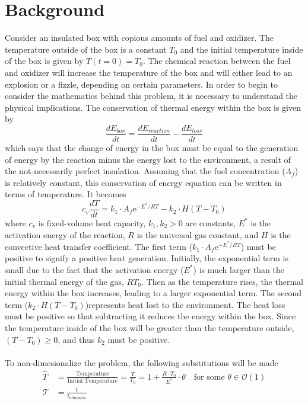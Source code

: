 \documentclass{article}
\begin{document}
\section*{Background}
Consider an insulated box with copious amounts of fuel and oxidizer.  The temperature outside of the box is a constant $T_0$ and the initial temperature inside of the box is given by $T(t=0)=T_0$.  The chemical reaction between the fuel and oxidizer will increase the temperature of the box and will either lead to an explosion or a fizzle, depending on certain parameters.  In order to begin to consider the mathematics behind this problem, it is necessary to understand the physical implications.  The conservation of thermal energy within the box is given by $$\frac{dE_{box}}{dt} = \frac{dE_{reaction}}{dt} - \frac{dE_{loss}}{dt}$$ 
which says that the change of energy in the box must be equal to the generation of energy by the reaction minus the energy lost to the environment, a result of the not-necessarily perfect insulation.  Assuming that the fuel concentration ($A_f$) is relatively constant, this conservation of energy equation can be written in terms of temperature.  It becomes $$c_v \frac{dT}{dt} = k_1 \cdot A_f \text{e}^{-E^*/RT} - k_2 \cdot H(T-T_0)$$ where $c_v$ is fixed-volume heat capacity, $k_1, k_2 > 0$ are constants, $E^*$ is the activation energy of the reaction, $R$  is the universal gas constant, and $H$ is the convective heat transfer coefficient.  The first term ($k_1 \cdot A_f \text{e}^{-E^*/RT}$) must be positive to signify a positive heat generation.  Initially, the exponential term is small due to the fact that the activation energy ($E^*$) is much larger than the initial thermal energy of the gas, $RT_0$. Then as the temperature rises, the thermal energy within the box increases, leading to a larger exponential term.  The second term ($ k_2 \cdot H(T-T_0)$)represents heat lost to the environment.  The heat loss must be positive so that subtracting it reduces the energy within the box.  Since the temperature inside of the box will be greater than the temperature outside, $(T-T_0) \geq 0$, and thus $k_2$ must be positive.  \\\\To non-dimesionalize the problem, the following substitutions will be made 
\begin{align*}
    \hat{T} &= \frac{\text{Temperature}}{\text{Initial Temperature}} = \frac{T}{T_0} = 1 + \frac{R\cdot T_0}{E^*}\cdot \theta \quad \text{for some $\theta\in \mathcal{O}(1)$}\\
    \mathcal{T} &= \frac{t}{t_{adiabatic}} 
\end{align*}
\end{document}
